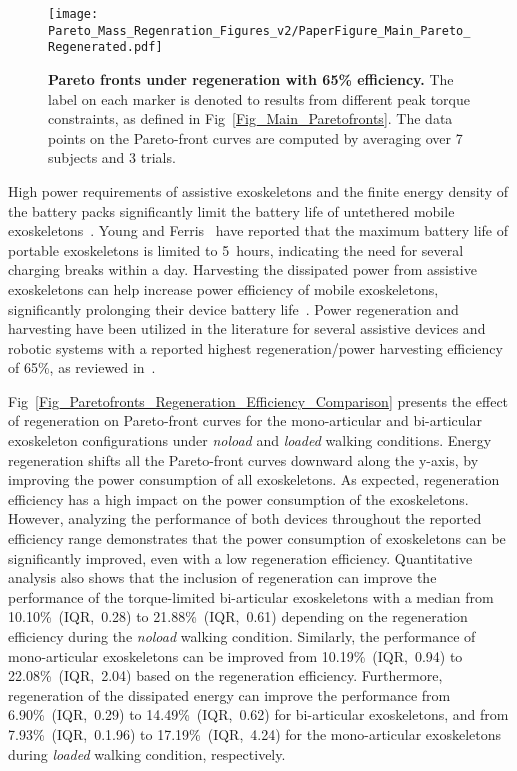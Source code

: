 \documentclass[10pt,letterpaper]{article}
\begin{document}
\begin{figure*}[t!]
	\centering
	\texttt{[image: Pareto\_Mass\_Regenration\_Figures\_v2/PaperFigure\_Main\_Pareto\_Regenerated.pdf]}
	\vspace{-4mm}
	\caption{{\small\textbf{Pareto fronts under regeneration with 65\% efficiency.} The label on each marker is denoted to results from different peak torque constraints, as defined in Fig~\ref{Fig_Main_Paretofronts}. The data points on the Pareto-front curves are computed by averaging over 7 subjects and 3 trials.}}
	\label{Fig_Regenerated_Main_Paretofronts}
\end{figure*}%

High power requirements of assistive exoskeletons and the finite energy density of the battery packs significantly limit the battery life of untethered mobile exoskeletons~\cite{Laschowski2019}. Young and Ferris~\cite{Young2017} have reported that the maximum battery life of portable exoskeletons is limited to 5~hours, indicating the need for several charging breaks within a day. Harvesting the dissipated power from assistive exoskeletons can help increase power efficiency of mobile exoskeletons, significantly prolonging their device battery life~\cite{Laschowski2019,Riemer2011}. Power regeneration and harvesting have been utilized in the literature for several assistive devices and robotic systems with a reported highest regeneration/power harvesting efficiency of 65\%, as reviewed in~\cite{Laschowski2019,Riemer2011}.

Fig~\ref{Fig_Paretofronts_Regeneration_Efficiency_Comparison}  presents the effect of regeneration on  Pareto-front curves for the  mono-articular and bi-articular exoskeleton configurations under \emph{noload} and \emph{loaded} walking conditions. Energy regeneration shifts all the Pareto-front curves downward along the y-axis, by improving the power consumption of all exoskeletons. As expected, regeneration efficiency has a high impact on the power consumption of the exoskeletons. However, analyzing the performance of both devices throughout the reported efficiency range demonstrates that the power consumption of exoskeletons can be significantly improved, even with a low regeneration efficiency. Quantitative analysis also shows that the inclusion of regeneration can improve the performance of the torque-limited bi-articular exoskeletons with a median from 10.10\%~(IQR,~0.28) to 21.88\%~(IQR,~0.61) depending on the regeneration efficiency during the \emph{noload} walking condition. Similarly, the performance of mono-articular exoskeletons can be improved from 10.19\%~(IQR,~0.94) to 22.08\%~(IQR,~2.04) based on the regeneration efficiency. Furthermore, regeneration of the dissipated energy can improve the performance from 6.90\%~(IQR,~0.29) to 14.49\%~(IQR,~0.62) for bi-articular exoskeletons, and from 7.93\%~(IQR,~0.1.96) to 17.19\%~(IQR,~4.24) for the mono-articular exoskeletons during \emph{loaded} walking condition, respectively.
\end{document}
